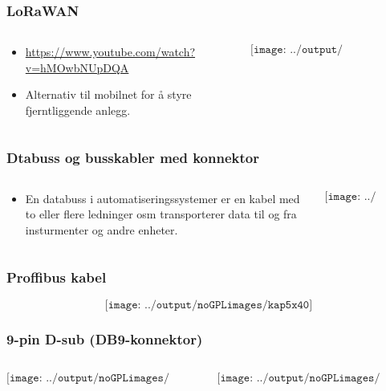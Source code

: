 \documentclass[aspectratio=169,xcolor=dvipsnames]{beamer}
\begin{document}
\begin{frame}
	\frametitle{LoRaWAN}
	\begin{columns}
		\begin{column}{0.5\textwidth}

			\begin{itemize}
				\item \url{https://www.youtube.com/watch?v=hMOwbNUpDQA}     
				\item Alternativ til mobilnet for å styre fjerntliggende anlegg. 
			\end{itemize}

			
		\end{column}

		\begin{column}{0.5\textwidth}
	$$\texttt{[image: ../output/noGPLimages/kap5x38]}$$
		\end{column}
	\end{columns}
\end{frame}
\begin{frame}
	\frametitle{Dtabuss og busskabler med konnektor}
	\begin{columns}
		\begin{column}{0.5\textwidth}

			\begin{itemize}
				\item En databuss i automatiseringssystemer er en kabel med to eller flere ledninger osm transporterer data til og fra insturmenter og andre enheter. 
			
			\end{itemize}

			
		\end{column}

		\begin{column}{0.5\textwidth}
	$$\texttt{[image: ../output/noGPLimages/kap5x39]}$$
		\end{column}
	\end{columns}
\end{frame}
\begin{frame}
	\frametitle{Proffibus kabel}
	$$\texttt{[image: ../output/noGPLimages/kap5x40]}$$
\end{frame}
\begin{frame}
	\frametitle{9-pin D-sub (DB9-konnektor)}
	\begin{columns}
		\begin{column}{0.5\textwidth}

	$$\texttt{[image: ../output/noGPLimages/kap5x41]}$$

			
		\end{column}

		\begin{column}{0.5\textwidth}
	$$\texttt{[image: ../output/noGPLimages/kap5x42]}$$
		\end{column}
	\end{columns}
\end{frame}
\end{document}
